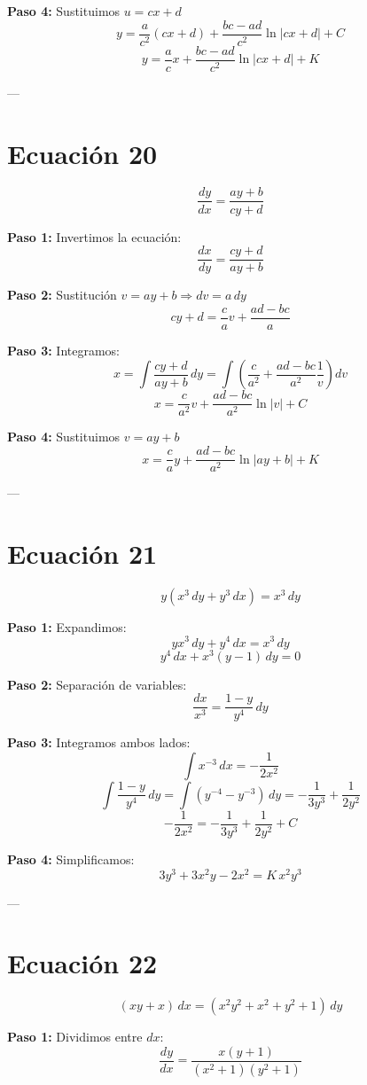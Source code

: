 \documentclass[12pt,a4paper]{article}
\begin{document}
\begin{multicols}{2}
	\textbf{Paso 4:} Sustituimos \(u = c x + d\)
	\[
	y = \frac{a}{c^2}(c x + d) + \frac{bc - ad}{c^2}\ln|c x + d| + C
	\]
	\[
	\boxed{y = \frac{a}{c}x + \frac{bc - ad}{c^2}\ln|c x + d| + K}
	\]
	
	---
	
	\section*{Ecuación 20}
	\[
	\frac{dy}{dx} = \frac{a y + b}{c y + d}
	\]
	
	\textbf{Paso 1:} Invertimos la ecuación:
	\[
	\frac{dx}{dy} = \frac{c y + d}{a y + b}
	\]
	
	\textbf{Paso 2:} Sustitución \(v = a y + b \Rightarrow dv = a\,dy\)
	\[
	c y + d = \frac{c}{a}v + \frac{ad - bc}{a}
	\]
	
	\textbf{Paso 3:} Integramos:
	\[
	x = \int \frac{c y + d}{a y + b}\,dy 
	= \int \left( \frac{c}{a^2} + \frac{ad - bc}{a^2}\frac{1}{v} \right) dv
	\]
	\[
	x = \frac{c}{a^2}v + \frac{ad - bc}{a^2}\ln|v| + C
	\]
	
	\textbf{Paso 4:} Sustituimos \(v = a y + b\)
	\[
	\boxed{x = \frac{c}{a}y + \frac{ad - bc}{a^2}\ln|a y + b| + K}
	\]
	
	---
	
	\section*{Ecuación 21}
	\[
	y(x^3\,dy + y^3\,dx) = x^3\,dy
	\]
	
	\textbf{Paso 1:} Expandimos:
	\[
	y x^3\,dy + y^4\,dx = x^3\,dy
	\]
	\[
	y^4\,dx + x^3(y - 1)\,dy = 0
	\]
	
	\textbf{Paso 2:} Separación de variables:
	\[
	\frac{dx}{x^3} = \frac{1 - y}{y^4}\,dy
	\]
	
	\textbf{Paso 3:} Integramos ambos lados:
	\[
	\int x^{-3}\,dx = -\frac{1}{2x^2}
	\]
	\[
	\int \frac{1 - y}{y^4}\,dy = \int(y^{-4} - y^{-3})\,dy = -\frac{1}{3y^3} + \frac{1}{2y^2}
	\]
	\[
	-\frac{1}{2x^2} = -\frac{1}{3y^3} + \frac{1}{2y^2} + C
	\]
	
	\textbf{Paso 4:} Simplificamos:
	\[
	\boxed{3y^3 + 3x^2y - 2x^2 = K\,x^2y^3}
	\]
	
	---
	
	\section*{Ecuación 22}
	\[
	(xy + x)\,dx = (x^2y^2 + x^2 + y^2 + 1)\,dy
	\]
	
	\textbf{Paso 1:} Dividimos entre \(dx\):
	\[
	\frac{dy}{dx} = \frac{x(y + 1)}{(x^2 + 1)(y^2 + 1)}
	\]
	

\end{multicols}
\end{document}
